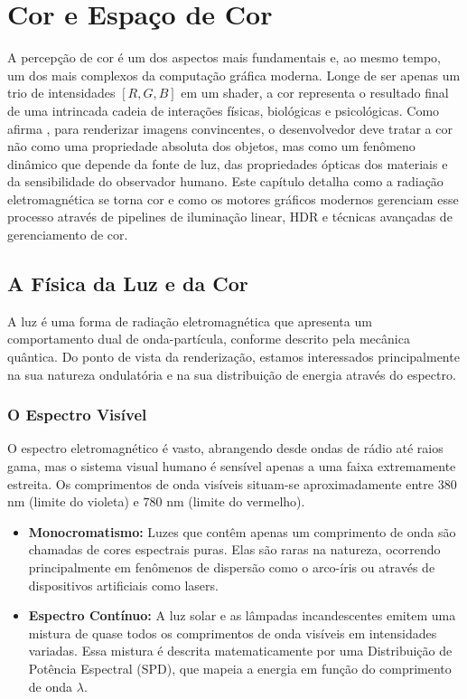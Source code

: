 \chapter{Cor e Espaço de Cor}

A percepção de cor é um dos aspectos mais fundamentais e, ao mesmo tempo, um dos mais complexos da computação gráfica moderna. Longe de ser apenas um trio de intensidades $[R, G, B]$ em um shader, a cor representa o resultado final de uma intrincada cadeia de interações físicas, biológicas e psicológicas. Como afirma \textcite{shirley2021fundamentals}, para renderizar imagens convincentes, o desenvolvedor deve tratar a cor não como uma propriedade absoluta dos objetos, mas como um fenômeno dinâmico que depende da fonte de luz, das propriedades ópticas dos materiais e da sensibilidade do observador humano. Este capítulo detalha como a radiação eletromagnética se torna cor e como os motores gráficos modernos gerenciam esse processo através de pipelines de iluminação linear, HDR e técnicas avançadas de gerenciamento de cor.

\section{A Física da Luz e da Cor}

A luz é uma forma de radiação eletromagnética que apresenta um comportamento dual de onda-partícula, conforme descrito pela mecânica quântica. Do ponto de vista da renderização, estamos interessados principalmente na sua natureza ondulatória e na sua distribuição de energia através do espectro.

\subsection{O Espectro Visível}

O espectro eletromagnético é vasto, abrangendo desde ondas de rádio até raios gama, mas o sistema visual humano é sensível apenas a uma faixa extremamente estreita. Os comprimentos de onda visíveis situam-se aproximadamente entre $380$ nm (limite do violeta) e $780$ nm (limite do vermelho). 

\begin{itemize}
    \item \textbf{Monocromatismo:} Luzes que contêm apenas um comprimento de onda são chamadas de cores espectrais puras. Elas são raras na natureza, ocorrendo principalmente em fenômenos de dispersão como o arco-íris ou através de dispositivos artificiais como lasers.
    \item \textbf{Espectro Contínuo:} A luz solar e as lâmpadas incandescentes emitem uma mistura de quase todos os comprimentos de onda visíveis em intensidades variadas. Essa mistura é descrita matematicamente por uma Distribuição de Potência Espectral (SPD), que mapeia a energia em função do comprimento de onda $\lambda$.
\end{itemize}

